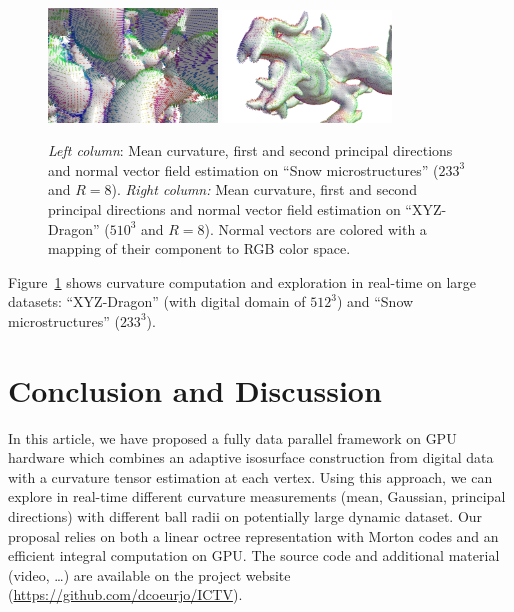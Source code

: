 \documentclass{llncs}
\begin{document}
\begin{figure}[h!]
\begin{center}
     {\includegraphics[width=0.4\textwidth]{figs/snow_r8_normales}}
     {\includegraphics[width=0.4\textwidth]{figs/dragon_r8_normales}}

   \end{center}
   \caption{\emph{Left column}: Mean curvature, first and second
     principal directions and normal vector field estimation on ``Snow microstructures'' ($233^3$ and $R=8$).
  \emph{Right column:} Mean curvature, first and second principal
  directions and normal vector field estimation on ``XYZ-Dragon'' ($510^3$
  and $R=8$). Normal vectors are colored with a mapping of their
  component to RGB color space.}\label{fig:adaptive}
   \vspace{-0.35cm}
 \end{figure}

 Figure~\ref{fig:adaptive} shows curvature computation and exploration in
 real-time on large datasets: ``XYZ-Dragon'' (with digital domain of $512^3$) and
 ``Snow microstructures'' ($233^3$).

\section{Conclusion and Discussion}
\label{sec:discussion}

In this article, we have proposed a fully data parallel framework on GPU
hardware which combines an adaptive isosurface construction from
digital data with a curvature tensor estimation at each vertex. Using
this approach, we can explore in real-time different curvature
measurements (mean, Gaussian, principal directions) with different
ball radii on potentially large dynamic dataset. Our proposal relies
on both a linear octree representation with Morton codes and an
efficient integral computation on GPU\@. The source code and additional
material (video, \ldots) are available on the project website
(\url{https://github.com/dcoeurjo/ICTV}).
\end{document}

